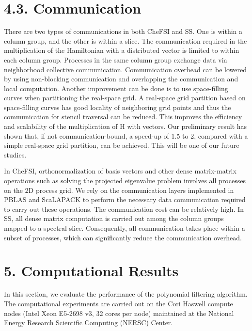 \documentclass[
  10
]{article}
\begin{document}
\section{4.3. Communication}\label{communication}

There are two types of communications in both CheFSI and SS. One is
within a column group, and the other is within a slice. The
communication required in the multiplication of the Hamiltonian with a
distributed vector is limited to within each column group. Processes in
the same column group exchange data via neighborhood collective
communication. Communication overhead can be lowered by using
non-blocking communication and overlapping the communication and local
computation. Another improvement can be done is to use space-filling
curves when partitioning the real-space grid. A real-space grid
partition based on space-filling curves has good locality of neighboring
grid points and thus the communication for stencil traversal can be
reduced. This improves the efficiency and scalability of the
multiplication of H with vectors. Our preliminary result has shown that,
if not communication-bound, a speed-up of 1.5 to 2, compared with a
simple real-space grid partition, can be achieved. This will be one of
our future studies.

In CheFSI, orthonormalization of basis vectors and other dense
matrix-matrix operations such as solving the projected eigenvalue
problem involves all processes on the 2D process grid. We rely on the
communication layers implemented in PBLAS and ScaLAPACK to perform the
necessary data communication required to carry out these operations. The
communication cost can be relatively high. In SS, all dense matrix
computation is carried out among the column groups mapped to a spectral
slice. Consequently, all communication takes place within a subset of
processes, which can significantly reduce the communication overhead.

\section{5. Computational Results}\label{computational-results}

In this section, we evaluate the performance of the polynomial filtering
algorithm. The computational experiments are carried out on the Cori
Haswell compute nodes (Intel Xeon E5-2698 v3, 32 cores per node)
maintained at the National Energy Research Scientific Computing (NERSC)
Center.
\end{document}
